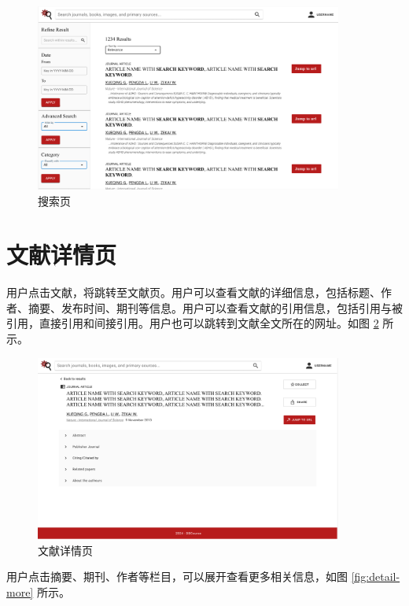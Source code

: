 \documentclass[UTF8,openany]{ctexbook}
\begin{document}
\begin{figure}[H]
\centering
\includegraphics[width=0.9\textwidth]{img/3.png}
\caption{搜索页}
\label{fig:search}
\end{figure}

\section{文献详情页}

用户点击文献，将跳转至文献页。用户可以查看文献的详细信息，包括标题、作者、摘要、发布时间、期刊等信息。用户可以查看文献的引用信息，包括引用与被引用，直接引用和间接引用。用户也可以跳转到文献全文所在的网址。如图 \ref{fig:detail} 所示。

\begin{figure}[H]
\centering
\includegraphics[width=0.9\textwidth]{img/4.png}
\caption{文献详情页}
\label{fig:detail}
\end{figure}

用户点击摘要、期刊、作者等栏目，可以展开查看更多相关信息，如图 \ref{fig:detail-more} 所示。
\end{document}
